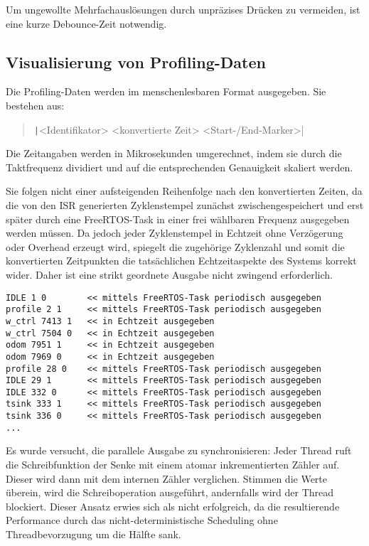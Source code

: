 Um ungewollte Mehrfachauslösungen durch unpräzises Drücken zu vermeiden, ist
eine kurze Debounce-Zeit notwendig.

\subsection{Visualisierung von Profiling-Daten}

Die Profiling-Daten werden im menschenlesbaren Format ausgegeben. Sie bestehen aus:

\begin{quote}
    \texttt|<Identifikator> <konvertierte Zeit> <Start-/End-Marker>|
\end{quote}

Die Zeitangaben werden in Mikrosekunden umgerechnet, indem sie durch die
Taktfrequenz dividiert und auf die entsprechenden Genauigkeit skaliert werden.

Sie folgen nicht einer aufsteigenden Reihenfolge nach den konvertierten Zeiten,
da die von den ISR generierten Zyklenstempel zunächst zwischengespeichert und
erst später durch eine FreeRTOS-Task in einer frei wählbaren Frequenz ausgegeben
werden müssen. Da jedoch jeder Zyklenstempel in Echtzeit ohne Verzögerung oder
Overhead erzeugt wird, spiegelt die zugehörige Zyklenzahl und somit die
konvertierten Zeitpunkten die tatsächlichen Echtzeitaspekte des Systems korrekt
wider. Daher ist eine strikt geordnete Ausgabe nicht zwingend erforderlich.

\begin{code}
\begin{verbatim}
IDLE 1 0        << mittels FreeRTOS-Task periodisch ausgegeben
profile 2 1     << mittels FreeRTOS-Task periodisch ausgegeben
w_ctrl 7413 1   << in Echtzeit ausgegeben
w_ctrl 7504 0   << in Echtzeit ausgegeben
odom 7951 1     << in Echtzeit ausgegeben
odom 7969 0     << in Echtzeit ausgegeben
profile 28 0    << mittels FreeRTOS-Task periodisch ausgegeben
IDLE 29 1       << mittels FreeRTOS-Task periodisch ausgegeben
IDLE 332 0      << mittels FreeRTOS-Task periodisch ausgegeben
tsink 333 1     << mittels FreeRTOS-Task periodisch ausgegeben
tsink 336 0     << mittels FreeRTOS-Task periodisch ausgegeben
...
\end{verbatim}
\end{code}

Es wurde versucht, die parallele Ausgabe zu synchronisieren: Jeder Thread ruft
die Schreibfunktion der Senke mit einem atomar inkrementierten Zähler auf.
Dieser wird dann mit dem internen Zähler verglichen. Stimmen die Werte überein,
wird die Schreiboperation ausgeführt, andernfalls wird der Thread blockiert.
Dieser Ansatz erwies sich als nicht erfolgreich, da die resultierende
Performance durch das nicht-deterministische Scheduling ohne Threadbevorzugung
um die Hälfte sank.

